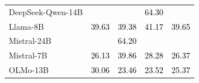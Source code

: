 \begin{figure}[H]
\begin{tabular}{lcccc}
DeepSeek-Qwen-14B & \cellcolor[HTML]{7387B3}\textcolor{white}{72.46} & \cellcolor[HTML]{7A8DB8}\textcolor{white}{67.68} & \cellcolor[HTML]{8294BC}\textcolor{black}{64.30} & \cellcolor[HTML]{7C8FB9}\textcolor{white}{67.13} \\

Llama-8B & \cellcolor[HTML]{B1BCD5}\textcolor{black}{39.63} & \cellcolor[HTML]{B3BED6}\textcolor{black}{39.38} & \cellcolor[HTML]{AFBBD4}\textcolor{black}{41.17} & \cellcolor[HTML]{B1BCD5}\textcolor{black}{39.65} \\

Mistral-24B & \cellcolor[HTML]{6F83B1}\textcolor{white}{74.26} & \cellcolor[HTML]{8294BC}\textcolor{black}{64.20} & \cellcolor[HTML]{7E91BA}\textcolor{white}{65.74} & \cellcolor[HTML]{768AB6}\textcolor{white}{69.80} \\

Mistral-7B & \cellcolor[HTML]{CCD4E4}\textcolor{black}{26.13} & \cellcolor[HTML]{B1BCD5}\textcolor{black}{39.86} & \cellcolor[HTML]{C8D0E2}\textcolor{black}{28.28} & \cellcolor[HTML]{CCD4E4}\textcolor{black}{26.37} \\

OLMo-13B & \cellcolor[HTML]{C4CDE0}\textcolor{black}{30.06} & \cellcolor[HTML]{D2D9E7}\textcolor{black}{23.46} & \cellcolor[HTML]{D0D7E6}\textcolor{black}{23.52} & \cellcolor[HTML]{CED5E5}\textcolor{black}{25.37} \\

\bottomrule
\end{tabular}
\end{figure}
